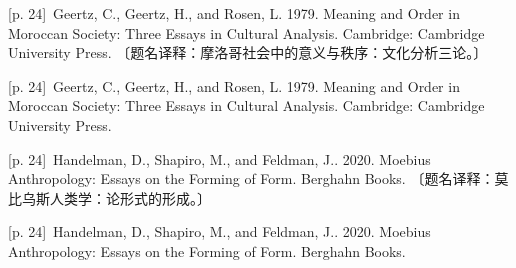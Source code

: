 \documentclass[10pt,a4paper]{article}
\begin{document}
\noindent\begin{minipage}{\textwidth}\begin{minipage}[t]{\dimexpr.5\textwidth-4mm\relax}\noindent\begin{minipage}[t]{\linewidth}{\scriptsize\color{gray} [p. 24]}\ Geertz, C., Geertz, H., and Rosen, L. 1979. Meaning and Order in Moroccan Society: Three Essays in Cultural Analysis. Cambridge: Cambridge University Press. 〔题名译释：摩洛哥社会中的意义与秩序：文化分析三论。〕\par\end{minipage}\par\end{minipage}\hfill\begin{minipage}[t]{\dimexpr.5\textwidth-4mm\relax}\noindent\begin{minipage}[t]{\linewidth}{\scriptsize\color{gray} [p. 24]}\ Geertz, C., Geertz, H., and Rosen, L. 1979. Meaning and Order in Moroccan Society: Three Essays in Cultural Analysis. Cambridge: Cambridge University Press.\par\end{minipage}\par\end{minipage}\end{minipage}\par
\noindent\begin{minipage}{\textwidth}\begin{minipage}[t]{\dimexpr.5\textwidth-4mm\relax}\noindent\begin{minipage}[t]{\linewidth}{\scriptsize\color{gray} [p. 24]}\ Handelman, D., Shapiro, M., and Feldman, J.. 2020. Moebius Anthropology: Essays on the Forming of Form. Berghahn Books. 〔题名译释：莫比乌斯人类学：论形式的形成。〕\par\end{minipage}\par\end{minipage}\hfill\begin{minipage}[t]{\dimexpr.5\textwidth-4mm\relax}\noindent\begin{minipage}[t]{\linewidth}{\scriptsize\color{gray} [p. 24]}\ Handelman, D., Shapiro, M., and Feldman, J.. 2020. Moebius Anthropology: Essays on the Forming of Form. Berghahn Books.\par\end{minipage}\par\end{minipage}\end{minipage}\par
\end{document}
